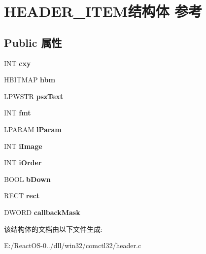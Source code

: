 \hypertarget{struct_h_e_a_d_e_r___i_t_e_m}{}\section{H\+E\+A\+D\+E\+R\+\_\+\+I\+T\+E\+M结构体 参考}
\label{struct_h_e_a_d_e_r___i_t_e_m}
\subsection*{Public 属性}
\begin{DoxyCompactItemize}
\item 
\mbox{\label{struct_h_e_a_d_e_r___i_t_e_m_a06b1d02b908ec6059577c8700384abab}} 
I\+NT {\bfseries cxy}
\item 
\mbox{\label{struct_h_e_a_d_e_r___i_t_e_m_a82d037de1e676129c92f0d30fe0dcf7a}} 
H\+B\+I\+T\+M\+AP {\bfseries hbm}
\item 
\mbox{\label{struct_h_e_a_d_e_r___i_t_e_m_a3071c387eab7173ef5bef4d4d4ae10c5}} 
L\+P\+W\+S\+TR {\bfseries psz\+Text}
\item 
\mbox{\label{struct_h_e_a_d_e_r___i_t_e_m_a81cdb8d3f93644ed9c694170f18f60c1}} 
I\+NT {\bfseries fmt}
\item 
\mbox{\label{struct_h_e_a_d_e_r___i_t_e_m_a3022b2b327eaa42f2820963fd850c681}} 
L\+P\+A\+R\+AM {\bfseries l\+Param}
\item 
\mbox{\label{struct_h_e_a_d_e_r___i_t_e_m_a4a7d71df2242315ef257735e0ffdeda8}} 
I\+NT {\bfseries i\+Image}
\item 
\mbox{\label{struct_h_e_a_d_e_r___i_t_e_m_aca2cf9d2c2b476b05ff2a7a05aadc1e4}} 
I\+NT {\bfseries i\+Order}
\item 
\mbox{\label{struct_h_e_a_d_e_r___i_t_e_m_a4ce6f590e5385b39e4e99bce51db8440}} 
B\+O\+OL {\bfseries b\+Down}
\item 
\mbox{\label{struct_h_e_a_d_e_r___i_t_e_m_a06a3653ecba54d4aa7ce6667dca22386}} 
\hyperlink{structtag_r_e_c_t}{R\+E\+CT} {\bfseries rect}
\item 
\mbox{\label{struct_h_e_a_d_e_r___i_t_e_m_af0538929a32759b8cf9a644b938305f7}} 
D\+W\+O\+RD {\bfseries callback\+Mask}
\end{DoxyCompactItemize}


该结构体的文档由以下文件生成\+:\begin{DoxyCompactItemize}
\item 
E\+:/\+React\+O\+S-\/0../dll/win32/comctl32/header.\+c\end{DoxyCompactItemize}

